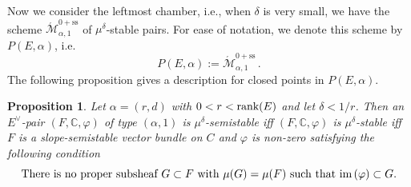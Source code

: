 \documentclass[11pt]{amsart}
\newtheorem{proposition}[theorem]{Proposition}
\theoremstyle{remark}
\newcommand{\C}{\mathbb{C}}
\newcommand{\Mdash}{\acute{\mathcal{M}}}
\newcommand{\im}{\textnormal{im}\,}
\newcommand{\rk}{\textnormal{rank}}
\newcommand{\vp}[0]{\varphi}
\renewcommand{\ss}[0]{\text{ss}}
\numberwithin{theorem}{section}
\begin{document}

    Now we consider the leftmost chamber, i.e., when $\delta$ is very small,
    we have the scheme $\Mdash^{0+\ss}_{\alpha,1}$ of $\mu^\delta$-stable pairs.
    For ease of notation, we denote this scheme by $P(E,\alpha)$, i.e.
    $$ P(E,\alpha) := \Mdash^{0+\ss}_{\alpha,1}\,.$$
    The following proposition gives a description for closed points in $P(E,\alpha)$.
    \begin{proposition}\label{proposition stability 0+ chamber}
        Let $\alpha = (r,d)$ with $0<r<\rk(E)$ and
        let $\delta < 1/r$.
        Then an $E^\vee$-pair $(F,\C,\vp)$ of type $(\alpha,1)$ is $\mu^\delta$-semistable iff
        $(F,\C,\vp)$ is $\mu^\delta$-stable iff
        $F$ is a slope-semistable vector bundle on $C$ and 
        $\vp$ is non-zero satisfying the following condition 
        \begin{equation}\label{condition small delta stability}
        \text{There is no proper subsheaf $G \subset F$ with $\mu(G)=\mu(F)$ such that $\im(\vp) \subset G$.}    
        \end{equation}
    \end{proposition}
\end{document}
